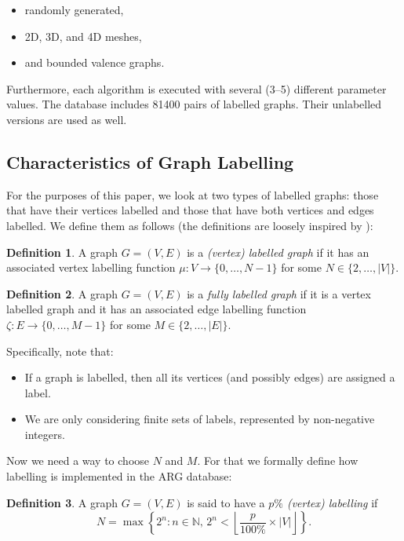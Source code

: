 \documentclass{l4proj}
\theoremstyle{definition}
\newtheorem{definition}{Definition}[chapter]
\theoremstyle{remark}
\begin{document}
\begin{itemize}
\item randomly generated,
\item 2D, 3D, and 4D meshes,
\item and bounded valence graphs.
\end{itemize}

Furthermore, each algorithm is executed with several (3--5) different parameter
values. The database includes 81400 pairs of labelled graphs. Their unlabelled
versions are used as well.

\subsection{Characteristics of Graph Labelling}
For the purposes of this paper, we look at two types of labelled graphs: those
that have their vertices labelled and those that have both vertices and edges
labelled. We define them as follows (the definitions are loosely inspired by
\cite{abu-aisheh_2016}):

\begin{definition}
  A graph $G = (V, E)$ is a \emph{(vertex) labelled graph} if it has an associated
  vertex labelling function $\mu \colon V \to \{ 0, \dots, N - 1 \}$ for some $N
  \in \{2, \dots, |V| \}$.
\end{definition}

\begin{definition}
  A graph $G = (V, E)$ is a \emph{fully labelled graph} if it is a vertex labelled
  graph and it has an associated edge labelling function $\zeta \colon E \to
  \{ 0, \dots, M - 1 \}$ for some $M \in \{ 2, \dots, |E| \}$.
\end{definition}

Specifically, note that:

\begin{itemize}
\item If a graph is labelled, then all its vertices (and possibly edges) are
  assigned a label.
\item We are only considering finite sets of labels, represented by non-negative integers.
\end{itemize}

Now we need a way to choose $N$ and $M$. For that we formally define how
labelling is implemented in the ARG database:

\begin{definition} \label{def:percent_labelling}
  A graph $G = (V, E)$ is said to have a \emph{$p\%$ (vertex) labelling} if
  \[ N = \max \left\{ 2^n : n \in \mathbb{N},\, 2^n < \left\lfloor \frac{p}{100\%}
        \times |V| \right\rfloor \right\}. \]
\end{definition}
\end{document}
